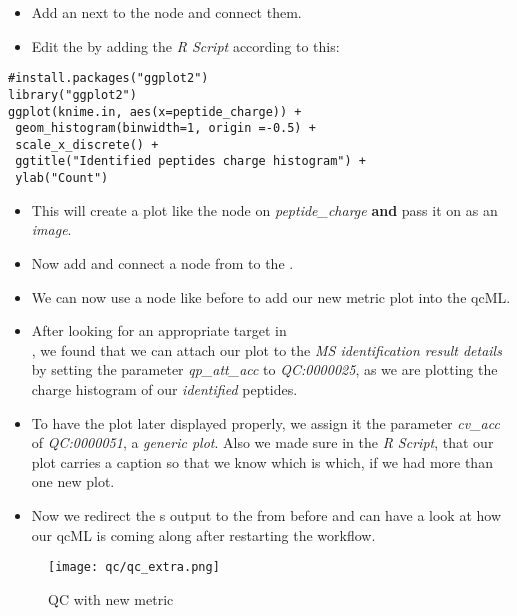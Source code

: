 \begin{itemize}
\item Add an  next to the  node and connect them.
\item Edit the  by adding the \textit{R Script} according to this:
\end{itemize}
\begin{code}
\begin{verbatim}
#install.packages("ggplot2")
library("ggplot2")
ggplot(knime.in, aes(x=peptide_charge)) + 
 geom_histogram(binwidth=1, origin =-0.5) + 
 scale_x_discrete() + 
 ggtitle("Identified peptides charge histogram") + 
 ylab("Count")
\end{verbatim}
\end{code}
\begin{itemize}
\item This will create a plot like the  node on \textit{peptide\_charge} \textbf{and} pass it on as an \textit{image}. 
\item Now add and connect a  node from  to the .
\item We can now use a  node like before to add our new metric plot into the qcML.
\item After looking for an appropriate target in \\ , we found that we can attach our plot to the \textit{MS identification result details} by setting the parameter \textit{qp\_att\_acc} to \textit{QC:0000025}, as we are plotting the charge histogram of our \textit{identified} peptides.
\item To have the plot later displayed properly, we assign it the parameter \textit{cv\_acc} of \textit{QC:0000051}, a \textit{generic plot}. Also we made sure in the \textit{R Script}, that our plot carries a caption so that we know which is which, if we had more than one new plot.
\item Now we redirect the s output to the  from before and can have a look at how our qcML is coming along after restarting the workflow.
\end{itemize}

\begin{figure}[htbp]
  \centering
  \texttt{[image: qc/qc\_extra.png]}
  \caption{QC with new metric}
  \label{fig:qc_extra}
\end{figure}

